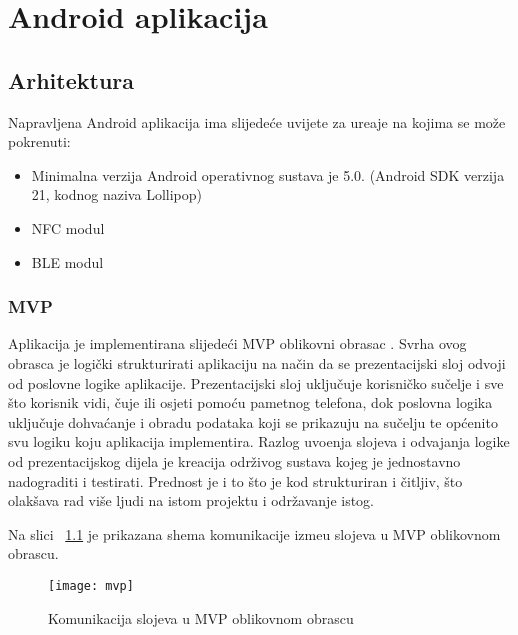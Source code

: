 \chapter{Android aplikacija}

\section{Arhitektura}

Napravljena Android aplikacija ima slijede\'{c}e uvijete za ure\dj aje na kojima se mo\v{z}e pokrenuti:

\begin{itemize}
		\item Minimalna verzija Android operativnog sustava je 5.0. (Android SDK verzija 21, kodnog naziva Lollipop)
		\item NFC modul
		\item BLE modul
\end{itemize}

\subsection{MVP}

Aplikacija je implementirana slijede\'{c}i MVP oblikovni obrasac \cite{mvp}. Svrha ovog obrasca je logi\v{c}ki strukturirati aplikaciju na na\v{c}in da se prezentacijski sloj odvoji od poslovne logike aplikacije. Prezentacijski sloj uklju\v{c}uje korisni\v{c}ko su\v{c}elje i sve \v{s}to korisnik vidi, \v{c}uje ili osjeti pomo\'{c}u pametnog telefona, dok poslovna logika uklju\v{c}uje dohva\'{c}anje i obradu podataka koji se prikazuju na su\v{c}elju te op\'{c}enito svu logiku koju aplikacija implementira. Razlog uvo\dj enja slojeva i odvajanja logike od prezentacijskog dijela je kreacija odr\v{z}ivog sustava kojeg je jednostavno nadograditi i testirati. Prednost je i to \v{s}to je kod strukturiran i \v{c}itljiv, \v{s}to olak\v{s}ava rad vi\v{s}e ljudi na istom projektu i odr\v{z}avanje istog.

Na slici ~\ref{fig:mvp} je prikazana shema komunikacije izme\dj u slojeva u MVP oblikovnom obrascu.

\begin{figure}[!htbp]
	\begin{center}
 \texttt{[image: mvp]}
 \caption{Komunikacija slojeva u MVP oblikovnom obrascu}
 \label{fig:mvp}
	\end{center}
\end{figure}

